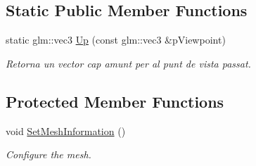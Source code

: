 \subsection*{Static Public Member Functions}
\begin{DoxyCompactItemize}
\item 
static glm\+::vec3 \hyperlink{class_sphere_point_cloud_a2182e6f3e31bb91347a4b3d15cf3ebbe}{Up} (const glm\+::vec3 \&p\+Viewpoint)
\begin{DoxyCompactList}\small\item\em Retorna un vector cap amunt per al punt de vista passat. \end{DoxyCompactList}\end{DoxyCompactItemize}
\subsection*{Protected Member Functions}
\begin{DoxyCompactItemize}
\item 
void \hyperlink{class_sphere_point_cloud_a01bf0317e5a3b1229bdafc9f4ff92c37}{Set\+Mesh\+Information} ()
\begin{DoxyCompactList}\small\item\em Configure the mesh. \end{DoxyCompactList}\end{DoxyCompactItemize}
